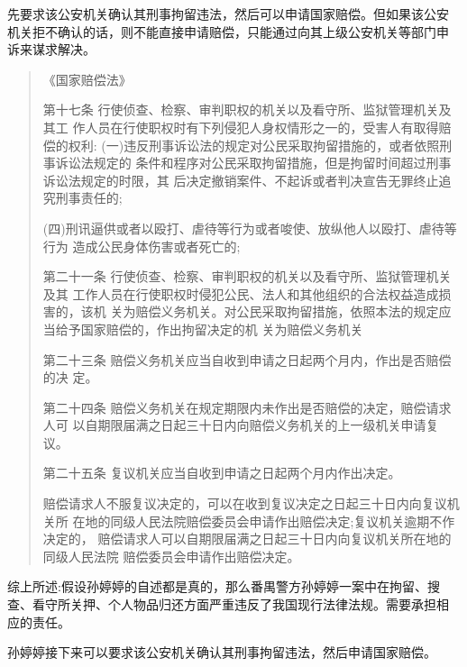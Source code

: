 \documentclass{ctexart}
\begin{document}
先要求该公安机关确认其刑事拘留违法，然后可以申请国家赔偿。但如果该公安 机关拒不确认的话，则不能直接申请赔偿，只能通过向其上级公安机关等部门申 诉来谋求解决。\par
\begin{quotation}
  《国家赔偿法》\par
  第十七条 行使侦查、检察、审判职权的机关以及看守所、监狱管理机关及其工 作人员在行使职权时有下列侵犯人身权情形之一的，受害人有取得赔偿的权利: (一)违反刑事诉讼法的规定对公民采取拘留措施的，或者依照刑事诉讼法规定的 条件和程序对公民采取拘留措施，但是拘留时间超过刑事诉讼法规定的时限，其 后决定撤销案件、不起诉或者判决宣告无罪终止追究刑事责任的; \par(四)刑讯逼供或者以殴打、虐待等行为或者唆使、放纵他人以殴打、虐待等行为 造成公民身体伤害或者死亡的;\par
  第二十一条 行使侦查、检察、审判职权的机关以及看守所、监狱管理机关及其 工作人员在行使职权时侵犯公民、法人和其他组织的合法权益造成损害的，该机 关为赔偿义务机关。对公民采取拘留措施，依照本法的规定应当给予国家赔偿的，作出拘留决定的机 关为赔偿义务机关 \par
  第二十三条 赔偿义务机关应当自收到申请之日起两个月内，作出是否赔偿的决 定。\par
  第二十四条 赔偿义务机关在规定期限内未作出是否赔偿的决定，赔偿请求人可 以自期限届满之日起三十日内向赔偿义务机关的上一级机关申请复议。\par
  第二十五条 复议机关应当自收到申请之日起两个月内作出决定。\par
  赔偿请求人不服复议决定的，可以在收到复议决定之日起三十日内向复议机关所 在地的同级人民法院赔偿委员会申请作出赔偿决定;复议机关逾期不作决定的， 赔偿请求人可以自期限届满之日起三十日内向复议机关所在地的同级人民法院 赔偿委员会申请作出赔偿决定。
\end{quotation}

综上所述:假设孙婷婷的自述都是真的，那么番禺警方孙婷婷一案中在拘留、搜 查、看守所关押、个人物品归还方面严重违反了我国现行法律法规。需要承担相 应的责任。\par
孙婷婷接下来可以要求该公安机关确认其刑事拘留违法，然后申请国家赔偿。
\end{document}
